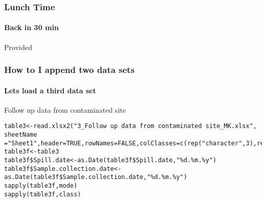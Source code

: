 \documentclass{article}\usepackage[]{graphicx}\usepackage[]{color}
\begin{document}
\begin{frame}
  \frametitle{Lunch Time}
  \framesubtitle{Back in 30 min}
  Provided
\end{frame}

\begin{frame}[fragile]
  \frametitle{How to I append two data sets}
  \framesubtitle{Lets load a third data set}
  \begin{block}{Follow up data from contaminated site}

  \end{block}
\begin{lstlisting} 
table3<-read.xlsx2("3_Follow up data from contaminated site_MK.xlsx", sheetName ="Sheet1",header=TRUE,rowNames=FALSE,colClasses=c(rep("character",3),rep("character",2),rep("numeric",18)))
table3f<-table3
table3f$Spill.date<-as.Date(table3f$Spill.date,"%d.%m.%y")
table3f$Sample.collection.date<-as.Date(table3f$Sample.collection.date,"%d.%m.%y")
sapply(table3f,mode)
sapply(table3f,class)
\end{lstlisting}
  

\end{frame}
\end{document}
